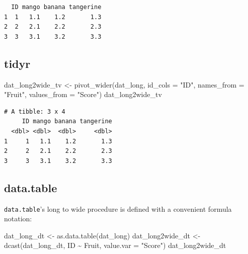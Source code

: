 \documentclass[
]{book}
\newenvironment{Shaded}{\begin{snugshade}}{\end{snugshade}}
\newcommand{\AttributeTok}[1]{\textcolor[rgb]{0.77,0.63,0.00}{#1}}
\newcommand{\FunctionTok}[1]{\textcolor[rgb]{0.00,0.00,0.00}{#1}}
\newcommand{\NormalTok}[1]{#1}
\newcommand{\OtherTok}[1]{\textcolor[rgb]{0.56,0.35,0.01}{#1}}
\newcommand{\SpecialCharTok}[1]{\textcolor[rgb]{0.00,0.00,0.00}{#1}}
\newcommand{\StringTok}[1]{\textcolor[rgb]{0.31,0.60,0.02}{#1}}
\begin{document}
\begin{verbatim}
  ID mango banana tangerine
1  1   1.1    1.2       1.3
2  2   2.1    2.2       2.3
3  3   3.1    3.2       3.3
\end{verbatim}

\hypertarget{tidyr-1}{%
\subsection{tidyr}\label{tidyr-1}}

\begin{Shaded}
\begin{Highlighting}[]
\NormalTok{dat\_long2wide\_tv }\OtherTok{\textless{}{-}} \FunctionTok{pivot\_wider}\NormalTok{(dat\_long,}
                                \AttributeTok{id\_cols =} \StringTok{"ID"}\NormalTok{,}
                                \AttributeTok{names\_from =} \StringTok{"Fruit"}\NormalTok{,}
                                \AttributeTok{values\_from =} \StringTok{"Score"}\NormalTok{)}
\NormalTok{dat\_long2wide\_tv}
\end{Highlighting}
\end{Shaded}

\begin{verbatim}
# A tibble: 3 x 4
     ID mango banana tangerine
  <dbl> <dbl>  <dbl>     <dbl>
1     1   1.1    1.2       1.3
2     2   2.1    2.2       2.3
3     3   3.1    3.2       3.3
\end{verbatim}

\hypertarget{data.table-1}{%
\subsection{data.table}\label{data.table-1}}

\texttt{data.table}'s long to wide procedure is defined with a convenient formula notation:

\begin{Shaded}
\begin{Highlighting}[]
\NormalTok{dat\_long\_dt }\OtherTok{\textless{}{-}} \FunctionTok{as.data.table}\NormalTok{(dat\_long)}
\NormalTok{dat\_long2wide\_dt }\OtherTok{\textless{}{-}} \FunctionTok{dcast}\NormalTok{(dat\_long\_dt,}
\NormalTok{                          ID }\SpecialCharTok{\textasciitilde{}}\NormalTok{ Fruit,}
                          \AttributeTok{value.var =} \StringTok{"Score"}\NormalTok{)}
\NormalTok{dat\_long2wide\_dt}
\end{Highlighting}
\end{Shaded}
\end{document}
